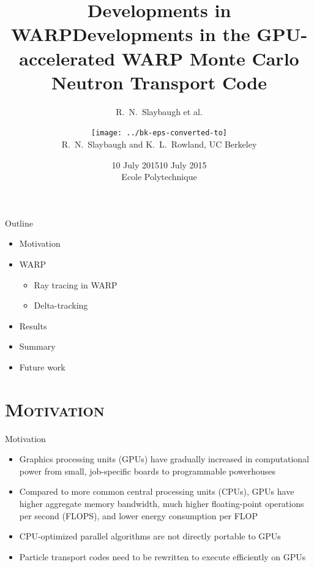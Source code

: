 \documentclass[xcolor=x11names, compress]{beamer}
\title{Developments in WARP}
\author{R.\ N.\ Slaybaugh et al.}
\date{10 July 2015}
\renewcommand{\(}{\begin{columns}}
\renewcommand{\)}{\end{columns}}
\newcommand{\<}[1]{\begin{column}{#1}}
\renewcommand{\>}{\end{column}}
\begin{document}
\begin{frame}[plain]
\title{Developments in the GPU-accelerated WARP Monte Carlo Neutron Transport Code}
\author{\texttt{[image: ../bk-eps-converted-to]}\\R.\ N.\ Slaybaugh and K.\ L.\ Rowland, UC Berkeley}%
\date{10 July 2015 \\ Ecole Polytechnique}
\titlepage
\end{frame}


\begin{frame}[fragile]{Outline}
	\begin{itemize}
	\item{Motivation}
	\item{WARP}
	\begin{itemize}
	    \item{Ray tracing in WARP}
	    \item{Delta-tracking}
	\end{itemize}
	\item{Results}
	\item{Summary}
	\item{Future work}
	\end{itemize}
\end{frame}


\section{\scshape Motivation}
\begin{frame}{Motivation}
	\begin{itemize}
	\item{Graphics processing units (GPUs) have gradually increased in computational power from small,
	job-specific boards to programmable powerhouses}
	\pause
	\item{Compared to more common central processing units (CPUs), GPUs have higher aggregate memory
	bandwidth, much higher floating-point operations per second (FLOPS), and lower energy consumption
	per FLOP \cite{warp}}
	\pause
	\item{CPU-optimized parallel algorithms are not directly portable to GPUs}
	\pause
	\item{Particle transport codes need to be rewritten to execute efficiently on GPUs 
	\cite{warp}}
	\end{itemize}
\end{frame}
\end{document}
